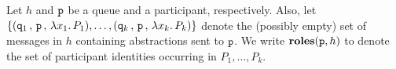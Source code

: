 \documentclass[runningheads]{llncs}
\begin{document}


\begin{definition}
Let 
$h$ and $\mathtt{p}$ be a queue 
and a participant, respectively. 
Also, let  
$\{(\mathtt{q}_1 \,,\, \mathtt{p} \,,\,\lambda x_1.\,P_1), \ldots, (\mathtt{q}_k \,,\, \mathtt{p} \,,\,\lambda x_k.\,P_k) \}$ 
 denote the (possibly empty) set of messages in $h$ containing abstractions sent to $\mathtt{p}$.
We write 
$\mathtt{\mathbf{roles}}(\mathtt{p}, h)$ to denote the set of participant identities occurring in 
$P_1, \ldots, P_k$.
\end{definition}




\end{document}
